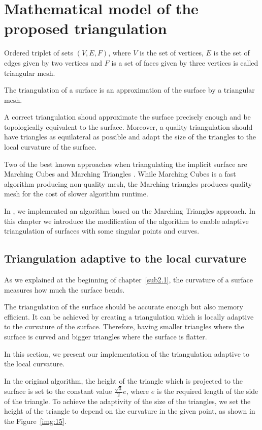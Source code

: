 \chapter{Mathematical model of the proposed triangulation}
\label{chap2}

Ordered triplet of sets $(V, E, F)$, where $V$ is the set of vertices, $E$ is the set of edges given
by two vertices and $F$ is a set of faces given by three vertices is called triangular
mesh.

The triangulation of a surface is an approximation of the surface by a triangular mesh.

A correct triangulation shoud approximate the surface precisely enough and
be topologically equivalent to the surface. Moreover, a quality triangulation
should have triangles as equilateral as possible and adapt the size of the triangles
to the local curvature of the surface.

Two of the best known approaches when triangulating the implicit surface are
Marching Cubes \cite{lorensen1987marching} and Marching Triangles \cite{hilton1996marching}.
While Marching Cubes is a fast algorithm producing non-quality mesh, the Marching triangles
produces quality mesh for the cost of slower algorithm runtime.

In \cite{korecova2021triangulation}, we implemented an algorithm based on the Marching
Triangles approach. In this chapter we introduce the modification of the algorithm 
to enable adaptive triangulation of surfaces with some singular points and curves. 

\section{Triangulation adaptive to the local curvature}
\label{sub3.1}

As we explained at the beginning of chapter~\ref{sub2.1}, the curvature of a surface
measures how much the surface bends.

The triangulation of the surface should be accurate enough but also memory efficient.
It can be achieved by creating a triangulation which is locally adaptive to the
curvature of the surface. Therefore, having smaller triangles where
the surface is curved and bigger triangles where the surface is flatter.

In this section, we present our implementation of the triangulation adaptive
to the local curvature.

In the original algorithm, the height of the triangle which is projected
to the surface is set to the constant value $\frac{\sqrt{3}}{2}e$, where $e$ 
is the required length of the side of the triangle. To achieve the adaptivity
of the size of the triangles, we set the height of the triangle to depend on the curvature in
the given point, as shown in the Figure~\ref{img:15}.

